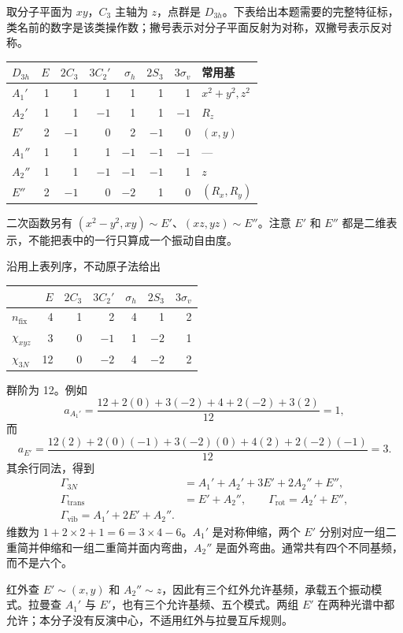 取分子平面为 $xy$，$C_3$ 主轴为 $z$，点群是 $D_{3h}$。下表给出本题需要的完整特征标，类名前的数字是该类操作数；撇号表示对分子平面反射为对称，双撇号表示反对称。
\begin{center}
\small
\begin{tabular}{lrrrrrrl}
\toprule
$D_{3h}$ & $E$ & $2C_3$ & $3C_2'$ & $\sigma_h$ & $2S_3$ & $3\sigma_v$ & 常用基\\
\midrule
$A_1'$ & 1 & 1 & 1 & 1 & 1 & 1 & $x^2+y^2,z^2$\\
$A_2'$ & 1 & 1 & $-1$ & 1 & 1 & $-1$ & $R_z$\\
$E'$ & 2 & $-1$ & 0 & 2 & $-1$ & 0 & $(x,y)$\\
$A_1''$ & 1 & 1 & 1 & $-1$ & $-1$ & $-1$ & ---\\
$A_2''$ & 1 & 1 & $-1$ & $-1$ & $-1$ & 1 & $z$\\
$E''$ & 2 & $-1$ & 0 & $-2$ & 1 & 0 & $(R_x,R_y)$\\
\bottomrule
\end{tabular}
\end{center}
二次函数另有 $(x^2-y^2,xy)\sim E'$、$(xz,yz)\sim E''$。注意 $E'$ 和 $E''$ 都是二维表示，不能把表中的一行只算成一个振动自由度。

\begin{worked}
沿用上表列序，不动原子法给出
\begin{center}
\small
\begin{tabular}{lrrrrrr}
\toprule
 & $E$ & $2C_3$ & $3C_2'$ & $\sigma_h$ & $2S_3$ & $3\sigma_v$\\
\midrule
$n_{\mathrm{fix}}$ & 4 & 1 & 2 & 4 & 1 & 2\\
$\chi_{xyz}$ & 3 & 0 & $-1$ & 1 & $-2$ & 1\\
$\chi_{3N}$ & 12 & 0 & $-2$ & 4 & $-2$ & 2\\
\bottomrule
\end{tabular}
\end{center}
群阶为 12。例如
\[
a_{A_1'}=\frac{12+2(0)+3(-2)+4+2(-2)+3(2)}{12}=1,
\]
而
\[
a_{E'}=\frac{12(2)+2(0)(-1)+3(-2)(0)+4(2)+2(-2)(-1)}{12}=3.
\]
其余行同法，得到
\begin{align*}
\Gamma_{3N}&=A_1'+A_2'+3E'+2A_2''+E'',\\
\Gamma_{\mathrm{trans}}&=E'+A_2'',\qquad
\Gamma_{\mathrm{rot}}=A_2'+E'',\\
\boxed{\Gamma_{\mathrm{vib}}=A_1'+2E'+A_2''}.&
\end{align*}
维数为 $1+2\times2+1=6=3\times4-6$。$A_1'$ 是对称伸缩，两个 $E'$ 分别对应一组二重简并伸缩和一组二重简并面内弯曲，$A_2''$ 是面外弯曲。通常共有四个不同基频，而不是六个。

红外查 $E'\sim(x,y)$ 和 $A_2''\sim z$，因此有三个红外允许基频，承载五个振动模式。拉曼查 $A_1'$ 与 $E'$，也有三个允许基频、五个模式。两组 $E'$ 在两种光谱中都允许；本分子没有反演中心，不适用红外与拉曼互斥规则。
\end{worked}

